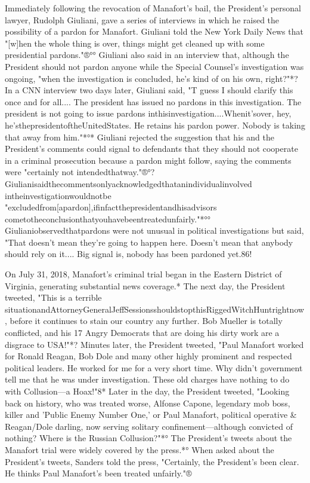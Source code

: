 Immediately following the revocation of Manafort's bail, the President's personal lawyer, Rudolph Giuliani, gave a series of interviews in which he raised the possibility of a pardon for Manafort.
Giuliani told the New York Daily News that "[w]hen the whole thing is over, things might get cleaned up with some presidential pardons."®°°
Giuliani also said in an interview that, although the President should not pardon anyone while the Special Counsel's investigation was ongoing, "when the investigation is concluded, he's kind of on his own, right?"*?
In a CNN interview two days later, Giuliani said, "T guess I should clarify this once and for all....
The president has issued no pardons in this investigation.
The president is not going to issue pardons inthisinvestigation....Whenit'sover, hey, he'sthepresidentoftheUnitedStates.
He retains his pardon power.
Nobody is taking that away from him."*°*
Giuliani rejected the suggestion that his and the President's comments could signal to defendants that they should not cooperate in a criminal prosecution because a pardon might follow, saying the comments were "certainly not intendedthatway."®°? Giulianisaidthecommentsonlyacknowledgedthatanindividualinvolved intheinvestigationwouldnotbe "excludedfrom[apardon],ifinfactthepresidentandhisadvisors
cometotheconclusionthatyouhavebeentreatedunfairly."*°°
Giulianiobservedthatpardons were not unusual in political investigations but said, "That doesn't mean they're going to happen here.
Doesn't mean that anybody should rely on it....
Big signal is, nobody has been pardoned yet.86!

On July 31, 2018, Manafort's criminal trial began in the Eastern District of Virginia, generating substantial news coverage.*
The next day, the President tweeted, "This is a terrible situationandAttorneyGeneralJeffSessionsshouldstopthisRiggedWitchHuntrightnow, before it continues to stain our country any further.
Bob Mueller is totally conflicted, and his 17 Angry Democrats that are doing his dirty work are a disgrace to USA!"*?
Minutes later, the President tweeted, "Paul Manafort worked for Ronald Reagan, Bob Dole and many other highly prominent and respected political leaders.
He worked for me for a very short time.
Why didn't government tell me that he was under investigation.
These old charges have nothing to do with Collusion—a Hoax!"8*
Later in the day, the President tweeted, "Looking back on history, who was treated worse, Alfonse Capone, legendary mob boss, killer and 'Public Enemy Number One,' or Paul Manafort, political operative \& Reagan/Dole darling, now serving solitary confinement—although convicted of nothing?
Where is the Russian Collusion?"*°
The President's tweets about the Manafort trial were widely covered by the press.*°
When asked about the President's tweets, Sanders told the press, "Certainly, the President's been clear.
He thinks Paul Manafort's been treated unfairly."®%

